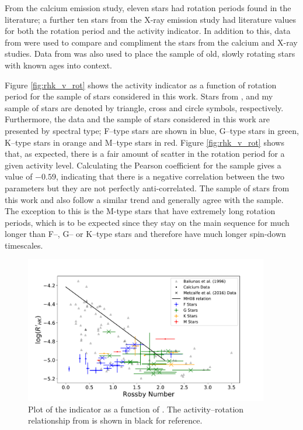From the calcium emission study, eleven stars had rotation periods found in the literature; a further ten stars from the X-ray emission study had literature values for both the rotation period and the \Rprime activity indicator. In addition to this, data from \citet{Metcalfe_etal_2016} were used to compare and compliment the stars from the calcium and X-ray studies. Data from \citet{Baliunas_etal_1996} was also used to place the sample of old, slowly rotating stars with known ages into context.

Figure \ref{fig:rhk_v_rot} shows the \Rprime activity indicator as a function of rotation period for the sample of stars considered in this work. Stars from \citet{Baliunas_etal_1996}, \citet{Metcalfe_etal_2016} and my sample of stars are denoted by triangle, cross and circle symbols, respectively. Furthermore, the \citet{Metcalfe_etal_2016} data and the sample of stars considered in this work are presented by spectral type; F--type stars are shown in blue, G--type stars in green, K--type stars in orange and M--type stars in red. Figure \ref{fig:rhk_v_rot} shows that, as expected, there is a fair amount of scatter in the rotation period for a given activity level. Calculating the Pearson coefficient for the \citet{Baliunas_etal_1996} sample gives a value of $-0.59$, indicating that there is a negative correlation between the two parameters but they are not perfectly anti-correlated. The sample of stars from this work and \citet{Metcalfe_etal_2016} also follow a similar trend and generally agree with the \citet{Baliunas_etal_1996} sample. The exception to this is the M-type stars that have extremely long rotation periods, which is to be expected since they stay on the main sequence for much longer than F--, G-- or K--type stars and therefore have much longer spin-down timescales.

\begin{figure}
    \centering
    \includegraphics[width=0.95\textwidth]{Figures/5-Activity_rotation/rhk_v_r0.pdf}
    \caption[\Rprime indicator as a function of \Ro]{Plot of the \Rprime indicator as a function of \Ro. The activity--rotation relationship from \citet{Mamajek_Hillenbrand_2008} is shown in black for reference.}
    \label{fig:rhk_v_ro}
\end{figure}

